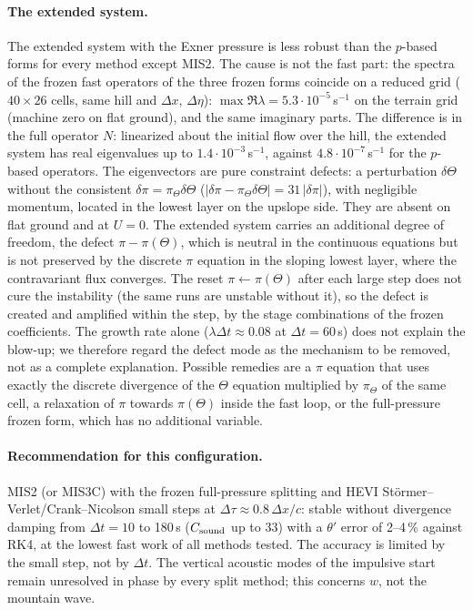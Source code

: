 \documentclass[11pt,a4paper]{article}
\newcommand{\dt}{\Delta t}
\begin{document}
\paragraph{The extended system.} The extended system with the Exner pressure is less robust than the
$p$-based forms for every method except MIS2. The cause is not the fast part: the spectra of the frozen
fast operators of the three frozen forms coincide on a reduced grid ($40\times26$ cells, same hill and
$\Delta x$, $\Delta\eta$): $\max\Re\lambda=5.3\cdot10^{-5}$\,s$^{-1}$ on the terrain grid
(machine zero on flat ground), and the same imaginary parts. The difference is in the full operator $N$:
linearized about the initial flow over the hill, the extended system has real eigenvalues up to
$1.4\cdot10^{-3}$\,s$^{-1}$, against $4.8\cdot10^{-7}$\,s$^{-1}$ for the $p$-based operators. The
eigenvectors are pure constraint defects: a perturbation $\delta\Theta$ without the consistent
$\delta\pi=\pi_\Theta\delta\Theta$ ($|\delta\pi-\pi_\Theta\delta\Theta|=31\,|\delta\pi|$), with negligible momentum, located in the lowest layer on the upslope
side. They are absent on flat ground and at $U=0$. The extended system carries an additional degree of
freedom, the defect $\pi-\pi(\Theta)$, which is neutral in the continuous equations but is not
preserved by the discrete $\pi$ equation in the sloping lowest layer, where the contravariant flux
converges. The reset $\pi\leftarrow\pi(\Theta)$ after each large step does not cure the instability
(the same runs are unstable without it), so the defect is created and amplified within the step,
by the stage combinations of the frozen coefficients. The growth rate alone ($\lambda\dt\approx0.08$ at
$\dt=60$\,s) does not explain the blow-up; we therefore regard the defect mode as the mechanism to be
removed, not as a complete explanation. Possible remedies are a $\pi$ equation that uses exactly the
discrete divergence of the $\Theta$ equation multiplied by $\pi_\Theta$ of the same cell, a
relaxation of $\pi$ towards $\pi(\Theta)$ inside the fast loop, or the full-pressure frozen form,
which has no additional variable.

\paragraph{Recommendation for this configuration.} MIS2 (or MIS3C) with the frozen full-pressure
splitting and HEVI Störmer--Verlet/Crank--Nicolson small steps at $\Delta\tau\approx0.8\,\Delta x/c$:
stable without divergence damping from $\dt=10$ to 180\,s ($C_{\rm sound}$ up to 33) with a $\theta'$
error of 2--4\,\% against RK4, at the lowest fast work of all methods tested. The accuracy is
limited by the small step, not by $\dt$. The vertical acoustic modes of the impulsive start remain
unresolved in phase by every split method; this concerns $w$, not the mountain wave.
\end{document}
